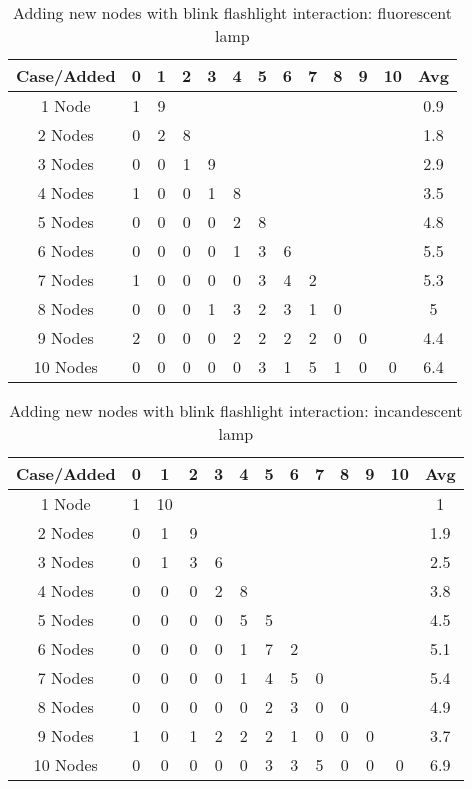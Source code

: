 \begin{table}[htdp]
\caption{{Adding new nodes with blink flashlight interaction: fluorescent lamp}}
\begin{center}
\begin{tabular}{|c|c|c|c|c|c|c|c|c|c|c|c|c|}
\hline
Case/Added	& 0 & 1 & 2 & 3 & 4 &5 &6 & 7 & 8 & 9& 10 & Avg \\
\hline
1 Node 								& 1 & 9&&&&&&&&&&0.9\\
\hline
2 Nodes								& 0 & 2 & 8&&&&&&&&&1.8\\
\hline
3 Nodes								& 0 & 0 & 1 & 9&&&&&&&&2.9\\
\hline
4 Nodes								& 1 & 0 & 0 & 1 & 8&&&&&&&3.5\\
\hline
5 Nodes								& 0 & 0 & 0 & 0 & 2 & 8&&&&&&4.8\\  
\hline
6 Nodes								& 0 & 0 & 0 & 0 & 1 & 3 & 6&&&&&5.5\\
\hline
7 Nodes								& 1 & 0 & 0 & 0 & 0 & 3 & 4 & 2&&&&5.3\\
\hline
8 Nodes								& 0 & 0 & 0 & 1 & 3 & 2 & 3 & 1 & 0&&&5\\
\hline
9 Nodes								& 2 & 0 & 0 & 0 & 2 & 2 & 2 & 2 & 0 &0&&4.4\\
\hline
10 Nodes								& 0 & 0 & 0 & 0 & 0 & 3 & 1 & 5 & 1 &0 & 0&6.4\\
\hline
\end{tabular}
\end{center}
\label{table:evaluation_new_node_flash_flu}
\end{table}%

\begin{table}[htdp]
\caption{{Adding new nodes with blink flashlight interaction: incandescent lamp}}
\begin{center}
\begin{tabular}{|c|c|c|c|c|c|c|c|c|c|c|c|c|}
\hline
Case/Added	& 0 & 1 & 2 & 3 & 4 &5 &6 & 7 & 8 & 9& 10 & Avg \\
\hline
1 Node 								& 1 & 10&&&&&&&&&&1\\
\hline
2 Nodes								& 0 & 1 & 9&&&&&&&&&1.9\\
\hline
3 Nodes								& 0 & 1 & 3 & 6&&&&&&&&2.5\\
\hline
4 Nodes								& 0 & 0 & 0 & 2 & 8&&&&&&&3.8\\
\hline
5 Nodes								& 0 & 0 & 0 & 0 & 5 & 5&&&&&&4.5\\  
\hline
6 Nodes								& 0 & 0 & 0 & 0 & 1 & 7 & 2&&&&&5.1\\
\hline
7 Nodes								& 0 & 0 & 0 & 0 & 1 & 4 & 5 & 0&&&&5.4\\
\hline
8 Nodes								& 0 & 0 & 0 & 0 & 0 & 2 & 3 & 0 & 0&&&4.9\\
\hline
9 Nodes								& 1 & 0 & 1 & 2 & 2 & 2 & 1 & 0 & 0 &0&&3.7\\
\hline
10 Nodes								& 0 & 0 & 0 & 0 & 0 & 3 & 3 & 5 & 0 &0 & 0 &6.9\\
\hline
\end{tabular}
\end{center}
\label{table:evaluation_new_node_flash_inc}
\end{table}%


